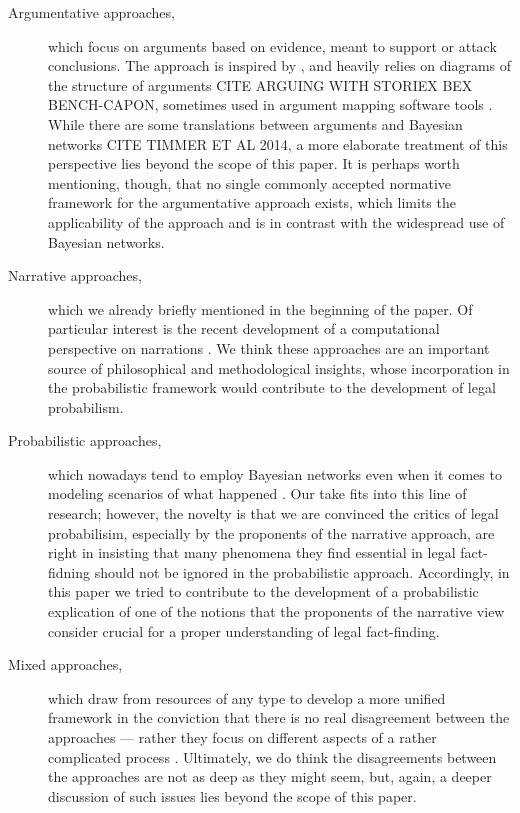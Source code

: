 \documentclass[10pt,]{scrartcl}
\begin{document}
\begin{description}

\item[Argumentative approaches,]  which focus on arguments based on evidence, meant to support or attack conclusions. The approach is inspired by \citet{wigmore2012principles}, and heavily relies on diagrams of the structure of arguments \citep{anderson2007visualization,bex2003towards} CITE ARGUING WITH STORIEX BEX BENCH-CAPON, sometimes used in argument mapping software tools \citep{verheij2007argumentation}. While there are some translations between arguments and Bayesian networks CITE TIMMER ET AL 2014, a more elaborate treatment of this perspective lies beyond the scope of this paper. It is perhaps worth mentioning, though, that no single commonly accepted normative framework for the argumentative approach exists, which limits the applicability of the approach and is in contrast with the widespread use of Bayesian networks. 


\item[Narrative approaches,] which we already briefly mentioned in the beginning of the paper. Of particular interest is the recent development of a  computational perspective on narrations \citep{bex2013legal}. We think these approaches are an important source of philosophical and methodological insights, whose incorporation in the probabilistic framework would contribute to the development of legal probabilism. 

  \item[Probabilistic approaches,] which nowadays tend to employ Bayesian networks \citep{fenton2011avoiding,fenton2012limiting,lagnado2013legal,fenton2013general,gittelson2013modeling,fenton2014calculating} even when it comes to modeling scenarios of what happened \citep[see e.g.][]{riesen2008validation,keppens2012argument,gittelson2013modeling,vlek2014building,vlek2016method,vlek2016stories}.  Our take fits into this line of research; however, the novelty is that we are convinced the critics of legal probabilisim, especially by the proponents of the narrative approach, are right in insisting that many phenomena they find essential in legal fact-fidning should not be ignored in the probabilistic approach. Accordingly, in this paper we tried to contribute to the development of a probabilistic explication of one of the notions that the proponents of the narrative view consider crucial for a proper understanding of legal fact-finding. 


\item[Mixed approaches,] which draw from resources of any type to develop a more unified framework in the conviction that there is no real disagreement between the approaches  \citep{spottswood2013bridging} --- rather they focus on different aspects of a rather complicated process \citep{shen2006scenario,bex2010hybrid,vlek2014building,verheij2014catch,verheij2015arguments,verheijproof2017}. Ultimately, we do think the disagreements between the approaches are not as deep as they might seem, but, again, a deeper discussion of such issues lies beyond the scope of this paper. 
\end{description}
\end{document}
